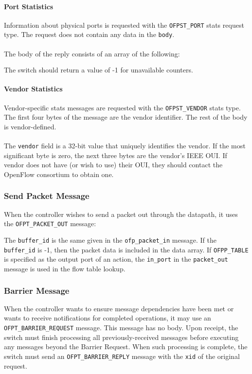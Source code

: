 \paragraph{Port Statistics}
Information about physical ports is requested with the \verb|OFPST_PORT| stats request type.  The request does not contain any data in the \verb|body|.
\\\\
The body of the reply consists of an array of the following:


The switch should return a value of -1 for unavailable counters.

\paragraph{Vendor Statistics}
Vendor-specific stats messages are requested with the \verb|OFPST_VENDOR| stats type. The first four bytes of the message are the vendor identifier. The rest of the body is vendor-defined.
\\\\
The \verb|vendor| field is a 32-bit value that uniquely identifies the vendor. If the most significant byte is zero, the next three bytes are the vendor's IEEE OUI. If vendor does not have (or wish to use) their OUI, they should contact the OpenFlow consortium to obtain one. 

\subsubsection{Send Packet Message}
When the controller wishes to send a packet out through the datapath, it uses the \verb|OFPT_PACKET_OUT| message:


The \verb|buffer_id| is the same given in the \verb|ofp_packet_in| message.  If the \verb|buffer_id| is -1, then the packet data is included in the data array. If \verb|OFPP_TABLE| is specified as the output port of an action, the \verb|in_port| in the \verb|packet_out| message is used in the flow table lookup.

\subsubsection{Barrier Message}
When the controller wants to ensure message dependencies have been met or wants to receive notifications for completed operations, it may use an \verb|OFPT_BARRIER_REQUEST| message.  This message has no body.  Upon receipt, the switch must finish processing all previously-received messages before executing any messages beyond the Barrier Request.  When such processing is complete, the switch must send an \verb|OFPT_BARRIER_REPLY| message with the \verb|xid| of the original request.

